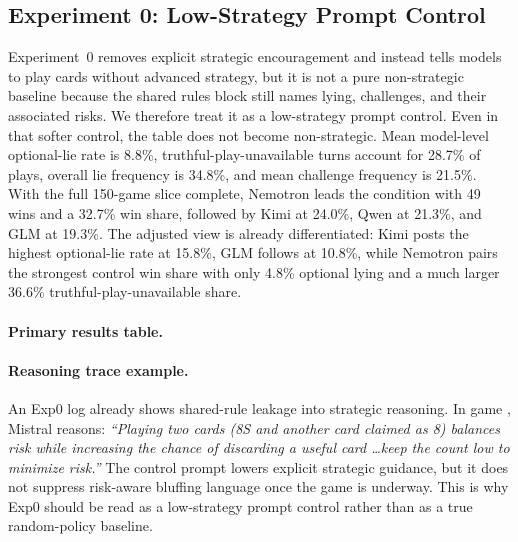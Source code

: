 \subsection{Experiment 0: Low-Strategy Prompt Control}

Experiment~0 removes explicit strategic encouragement and instead tells models to play cards without advanced strategy, but it is not a pure non-strategic baseline because the shared rules block still names lying, challenges, and their associated risks. We therefore treat it as a low-strategy prompt control. Even in that softer control, the table does not become non-strategic. Mean model-level optional-lie rate is 8.8\%, truthful-play-unavailable turns account for 28.7\% of plays, overall lie frequency is 34.8\%, and mean challenge frequency is 21.5\%. With the full 150-game slice complete, Nemotron leads the condition with 49 wins and a 32.7\% win share, followed by Kimi at 24.0\%, Qwen at 21.3\%, and GLM at 19.3\%. The adjusted view is already differentiated: Kimi posts the highest optional-lie rate at 15.8\%, GLM follows at 10.8\%, while Nemotron pairs the strongest control win share with only 4.8\% optional lying and a much larger 36.6\% truthful-play-unavailable share.

\paragraph{Primary results table.}
\begin{center}
\scriptsize
{}
\end{center}

\paragraph{Reasoning trace example.}
An Exp0 log already shows shared-rule leakage into strategic reasoning. In game , Mistral reasons: \emph{``Playing two cards (8S and another card claimed as 8) balances risk while increasing the chance of discarding a useful card \ldots keep the count low to minimize risk.''} The control prompt lowers explicit strategic guidance, but it does not suppress risk-aware bluffing language once the game is underway. This is why Exp0 should be read as a low-strategy prompt control rather than as a true random-policy baseline.

